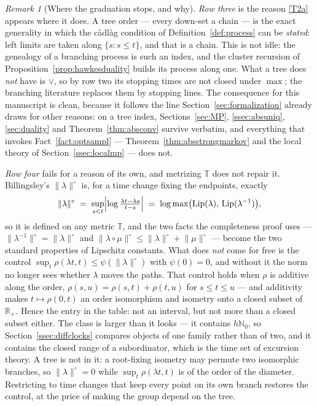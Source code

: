 \documentclass[11pt,a4paper]{article}
\theoremstyle{plain}
\theoremstyle{definition}
\theoremstyle{remark}
\newtheorem{remark}[theorem]{Remark}
\newcommand{\R}{\mathbb{R}}
\newcommand{\N}{\mathbb{N}}
\newcommand{\Rp}{\R_+}
\newcommand{\T}{\mathbb{T}}                     %
\begin{document}
\begin{remark}[Where the graduation stops, and why]
  \emph{Row three} is the reason \eqref{T2a} appears where it does.  A tree
  order --- every down-set a chain --- is the exact generality in which
  the c\`adl\`ag condition of Definition~\ref{def:process} can be \emph{stated}: left limits are taken along
  $\{s : s \leq t\}$, and that is a chain.  This is not idle: the genealogy of a
  branching process is such an index, and the cluster recursion of
  Proposition~\ref{prop:hawkesduality} builds its process along one.  What a tree
  does \emph{not} have is $\vee$, so by row two its stopping times are not closed
  under $\max$; the branching literature replaces them by stopping lines.  The
  consequence for this manuscript is clean, because it follows the line
  Section~\ref{sec:formalization} already draws for other reasons: on a tree
  index, Sections~\ref{sec:MP}, \ref{ssec:absuniq}, \ref{sec:duality} and
  Theorem~\ref{thm:absconv} survive verbatim, and everything that invokes
  Fact~\ref{fact:optsampl} --- Theorem~\ref{thm:absstrongmarkov} and the local
  theory of Section~\ref{ssec:localmp} --- does not.

  \emph{Row four} fails for a reason of its own, and metrizing $\T$ does not
  repair it.  Billingsley's $\lVert \lambda \rVert^\circ$ is, for a time change
  fixing the endpoints, exactly
  \[
    \lVert \lambda \rVert^\circ
      \;=\; \sup_{s < t} \Bigl| \log \tfrac{\lambda t - \lambda s}{t - s} \Bigr|
      \;=\; \log \max\bigl( \operatorname{Lip}(\lambda),\, \operatorname{Lip}(\lambda^{-1}) \bigr),
  \]
  so it is defined on any metric $\T$, and the two facts the completeness proof
  uses --- $\lVert \lambda^{-1} \rVert^\circ = \lVert \lambda \rVert^\circ$ and
  $\lVert \lambda \circ \mu \rVert^\circ \leq \lVert \lambda \rVert^\circ +
  \lVert \mu \rVert^\circ$ --- become the two standard properties of Lipschitz
  constants.  What does \emph{not} come for free is the control
  $\sup_t \rho(\lambda t, t) \leq \psi(\lVert \lambda \rVert^\circ)$ with
  $\psi(0) = 0$, and without it the norm no longer sees whether $\lambda$ moves
  the paths.  That control holds when $\rho$ is additive along the order,
  $\rho(s,u) = \rho(s,t) + \rho(t,u)$ for $s \leq t \leq u$ --- and additivity
  makes $t \mapsto \rho(0,t)$ an order isomorphism and isometry onto a closed
  subset of $\Rp$.  Hence the entry in the table: not an interval, but not more
  than a closed subset either.  The class is larger than it looks --- it contains
  $h\N_0$, so Section~\ref{ssec:diffclocks} compares objects of one family rather
  than of two, and it contains the closed range of a subordinator, which is the
  time set of excursion theory.  A tree is not in it: a root-fixing isometry may
  permute two isomorphic branches, so $\lVert \lambda \rVert^\circ = 0$ while
  $\sup_t \rho(\lambda t, t)$ is of the order of the diameter.  Restricting to
  time changes that keep every point on its own branch restores the control, at
  the price of making the group depend on the tree.


\end{remark}
\end{document}
